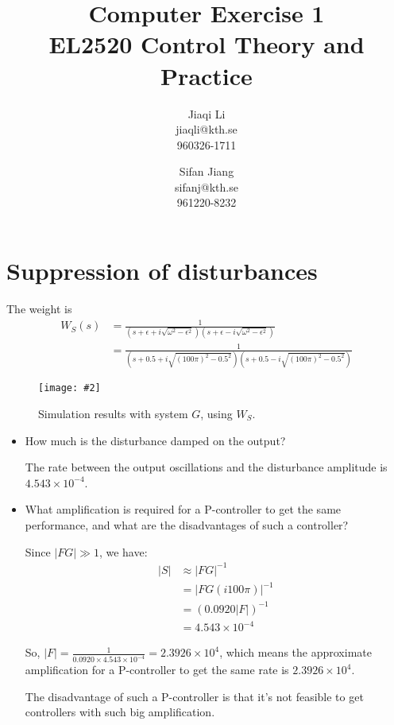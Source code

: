 \documentclass[11pt,a4paper]{article}
\title{
	Computer Exercise 1\\
	EL2520 Control Theory and Practice
}
\author{
	Jiaqi Li\\
	jiaqli@kth.se\\
	960326-1711
	\and
	Sifan Jiang\\
	sifanj@kth.se\\
	961220-8232
}
\newcommand{\image}[3]{
	\begin{figure}[!ht]
		\centering
	    \texttt{[image: \#2]}
		\caption{#3}
		\label{fig:#2}
	\end{figure}
}
\begin{document}
\maketitle


\section*{Suppression of disturbances}
\par The weight is
	\begin{align*}
		W_S(s) &= \frac{1}{(s+\epsilon+i\sqrt{\omega^{2}-\epsilon^{2}})(s+\epsilon-i\sqrt{\omega^{2}-\epsilon^{2}})} \\
		&= \frac{1}{(s+0.5+i\sqrt{(100\pi)^{2}-0.5^{2}})(s+0.5-i\sqrt{(100\pi)^{2}-0.5^{2}})}
	\end{align*}

	\image{0.75}{suppressionOfDisturbanceResult}{Simulation results with system $G$, using $W_S$.}
	
	\begin{itemize}
		\item How much is the disturbance damped on the output?
		\par The rate between the output oscillations and the disturbance amplitude is $4.543\times 10^{-4}$.

		\item What amplification is required for a P-controller to get the same performance, and what are the disadvantages of such a controller?
		\par Since $|FG| \gg 1$, we have:
			\begin{align*}
				|S| &\approx |FG|^{-1} \\
				&= |FG(i 100\pi)|^{-1} \\
				&= (0.0920|F|)^{-1} \\
				&= 4.543\times 10^{-4}
			\end{align*}
		\par So, $|F|=\frac{1}{0.0920\times4.543\times 10^{-4}}=2.3926\times10^{4}$, which means the approximate amplification for a P-controller to get the same rate is $2.3926\times10^{4}$.
		\par The disadvantage of such a P-controller is that it's not feasible to get controllers with such big amplification.
	\end{itemize}


\end{document}
